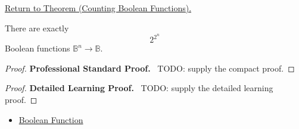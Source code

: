 \newpage
{}
\label{prf:counting-boolean-functions}

\begin{remark*}[Return]
\hyperref[thm:counting-boolean-functions]{Return to Theorem (Counting Boolean Functions).}
\end{remark*}

\begin{theorem*}
There are exactly
\[
2^{2^n}
\]
Boolean functions \(\mathbb{B}^n\to\mathbb{B}\).
\end{theorem*}

\begin{proof}
\textbf{Professional Standard Proof.}~
TODO: supply the compact proof.
\end{proof}

\begin{proof}
\textbf{Detailed Learning Proof.}~
TODO: supply the detailed learning proof.
\end{proof}

\begin{remark*}
\end{remark*}

\begin{dependencies}
\begin{itemize}
  \item \hyperref[def:boolean-function-propositional-logic]{Boolean Function}
\end{itemize}
\end{dependencies}

\clearpage
